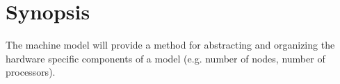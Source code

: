 \section{Synopsis}

The machine model will provide a method for abstracting and organizing the
hardware specific components of a model (e.g. number of nodes, number of processors).
